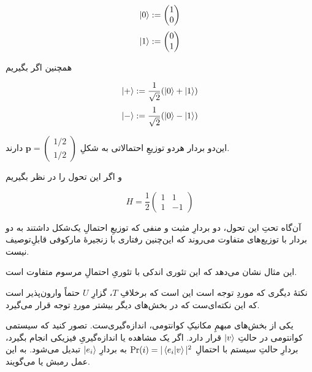 \begin{equation} \ket{0} := \begin{pmatrix} 1 \\ 0 \end{pmatrix} \end{equation}
\begin{equation} \ket{1} := \begin{pmatrix} 0 \\ 1 \end{pmatrix} \end{equation}

همچنین اگر بگیریم

\begin{equation} \ket{+} := \frac{1}{\sqrt{2}} (\ket{0} + \ket{1}) \end{equation}
\begin{equation} \ket{-} := \frac{1}{\sqrt{2}} (\ket{0} - \ket{1}) \end{equation}

این‌دو بردار هردو توزیعِ احتمالاتی به شکلِ 
\(\mathbf{p} = \begin{pmatrix} 1/2 \\ 1/2 \end{pmatrix} \)
دارند.

و اگر این تحول را در نظر بگیریم

\begin{equation} H = \frac{1}{2} \begin{pmatrix} 1 & 1 \\ 1 & -1 \end{pmatrix} \end{equation}

آن‌گاه تحتِ این تحول، دو بردارِ مثبت و منفی که توزیعِ احتمالِ یک‌شکل داشتند به دو بردار با توزیع‌های متفاوت می‌روند که این‌چنین رفتاری با زنجیرهٔ مارکوفی قابلِ‌توصیف نیست.

این مثال نشان می‌دهد که این تئوری اندکی با تئوریِ احتمالِ مرسوم متفاوت است.

نکتهٔ دیگری که موردِ‌ توجه است این است که برخلافِ \(T\)، گزارِ \(U\) حتماً وارون‌پذیر است که این نکته‌ای‌ست که در بخش‌های دیگر بیشتر موردِ توجه قرار می‌گیرد.


یکی از بخش‌های مبهمِ مکانیکِ کوانتومی، اندازه‌گیری‌ست. تصور کنید که سیستمی کوانتومی در حالتِ
\(\ket{v}\)
قرار دارد. اگر یک مشاهده یا اندازه‌گیریِ فیزیکی انجام بگیرد، بردارِ حالتِ سیستم با احتمالِ
\(\Pr(i) = |\braket{e_i}{v}|^2\)
به بردارِ 
\(\ket{e_i}\)
تبدیل می‌شود. به این عمل رمبش یا
می‌گویند.

